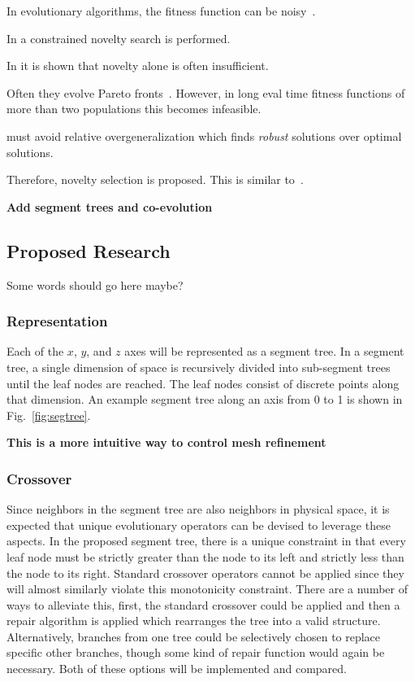 \documentclass{article}
\begin{document}
In evolutionary algorithms, the fitness function can be noisy~\cite{ref:Jin2005}.

In \cite{ref:Liapis2015} a constrained novelty search is performed.

In \cite{ref:smith2015} it is shown that novelty alone is often insufficient.

Often they evolve Pareto fronts~\cite{ref:Bucci2005}. However, in long eval time fitness functions of more than two populations this becomes infeasible.

must avoid relative overgeneralization which finds \textit{robust} solutions over optimal solutions.

Therefore, novelty selection is proposed. This is similar to~\cite{ref:Lehman2011}.

\textbf{Add segment trees and co-evolution}

\subsection{Proposed Research}\label{sec:b3}
Some words should go here maybe?

\subsubsection{Representation}
Each of the $x$, $y$, and $z$ axes will be represented as a segment tree. In a segment tree, a single dimension of space is recursively divided into sub-segment trees until the leaf nodes are reached. The leaf nodes consist of discrete points along that dimension. An example segment tree along an axis from 0 to 1 is shown in Fig.~\ref{fig:segtree}.

\textbf{This is a more intuitive way to control mesh refinement}

\subsubsection{Crossover}
Since neighbors in the segment tree are also neighbors in physical space, it is expected that unique evolutionary operators can be devised to leverage these aspects. In the proposed segment tree, there is a unique constraint in that every leaf node must be strictly greater than the node to its left and strictly less than the node to its right. Standard crossover operators cannot be applied since they will almost similarly violate this monotonicity constraint. There are a number of ways to alleviate this, first, the standard crossover could be applied and then a repair algorithm is applied which rearranges the tree into a valid structure. Alternatively, branches from one tree could be selectively chosen to replace specific other branches, though some kind of repair function would again be necessary. Both of these options will be implemented and compared.
\end{document}

